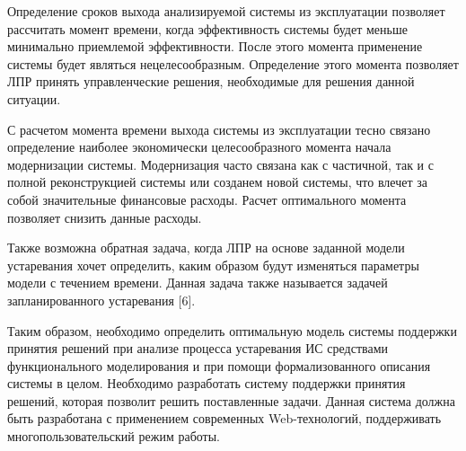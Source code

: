 Определение сроков выхода анализируемой системы из эксплуатации позволяет рассчитать момент времени, когда эффективность системы будет меньше минимально приемлемой эффективности. 
После этого момента применение системы будет являться нецелесообразным. Определение этого момента позволяет ЛПР принять управленческие решения, необходимые для решения данной ситуации.

С расчетом момента времени выхода системы из эксплуатации тесно связано определение наиболее экономически целесообразного момента начала модернизации системы. 
Модернизация часто связана как с частичной, так и с полной реконструкцией системы или созданем новой системы, что влечет за собой значительные финансовые расходы. 
Расчет оптимального момента позволяет снизить данные расходы.

Также возможна обратная задача, когда ЛПР на основе заданной модели устаревания хочет определить, каким образом будут изменяться параметры модели с течением времени. 
Данная задача также называется задачей запланированного устаревания [6].

Таким образом, необходимо определить оптимальную модель системы поддержки принятия решений при анализе процесса устаревания ИС средствами функционального моделирования и при помощи формализованного описания системы в целом. 
Необходимо разработать систему поддержки принятия решений, которая позволит решить поставленные задачи. 
Данная система должна быть разработана с применением современных Web-технологий, поддерживать многопользовательский режим работы.

